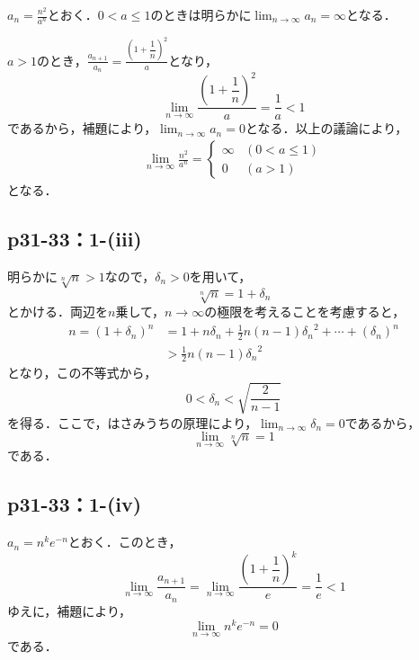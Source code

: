 \documentclass[uplatex,dvipdfmx,a4paper,10pt,fleqn]{jsarticle}
\begin{document}
\begin{tleftbar}
        $a_n = \frac{n^2}{a^n}$とおく．$0<a \le 1$のときは明らかに$\lim_{n \to \infty} a_n=\infty$となる．\par 
        $a>1$のとき，$\frac{a_{n+1}}{a_n} =\frac{\left(1+\dfrac{1}{n}\right)^2}{a}$となり，
        \[
            \lim_{n \to \infty} \frac{\left(1+\dfrac{1}{n}\right)^2}{a} = \frac{1}{a} <1
        \]
        であるから，補題により，$\lim_{n \to \infty} a_n =0$となる．以上の議論により，
        \begin{align*}
            \lim_{n \to \infty} \frac{n^2}{a^n}
            =
            \begin{cases}
                \infty & (0<a \le 1) \\
                0 & (a>1)
            \end{cases}
        \end{align*}
        となる．
	\end{tleftbar}
    \subsection*{p31-33：1-(iii)}
\begin{tleftbar}
    明らかに$\sqrt[n]{n} >1$なので，$\delta_n >0$を用いて，
    \[
        \sqrt[n]{n} = 1+ \delta_n
    \]
    とかける．両辺を$n$乗して，$n \to \infty$の極限を考えることを考慮すると，
    \begin{align*}
        n = (1+\delta_n)^n &=1 + n \delta_n + \frac{1}{2}n(n-1) {\delta_n}^2 + \cdots + (\delta_n)^n \\
        & > \frac{1}{2}n(n-1) {\delta_n}^2
    \end{align*}
    となり，この不等式から，
    \[
        0<\delta_n < \sqrt{\frac{2}{n-1}}
    \]
    を得る．ここで，はさみうちの原理により，$\lim_{n \to \infty} \delta_n =0$であるから，
    \[
        \lim_{n \to \infty} \sqrt[n]{n} =1
    \]
    である．
\end{tleftbar}

\subsection*{p31-33：1-(iv)}
\begin{tleftbar}
      $a_n= n^k e^{-n}$とおく．このとき，
      \[
          \lim_{n \to \infty} \frac{a_{n+1}}{a_n} =  \lim_{n \to \infty} \frac{\left(1+\dfrac{1}{n}\right)^k}{e} =\frac{1}{e} <1
      \]
      ゆえに，補題により，
      \[
        \lim_{n \to \infty} n^k e^{-n}=0
      \]
      である．
\end{tleftbar}
\end{document}
